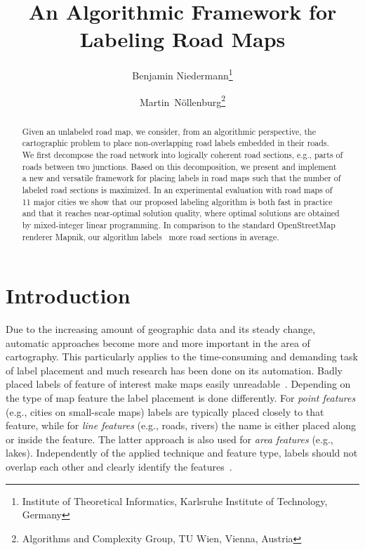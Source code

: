 \documentclass[a4paper,11pt]{article}
\title{An Algorithmic Framework for Labeling Road Maps}
\author{Benjamin Niedermann\thanks{Institute of Theoretical Informatics, Karlsruhe Institute of Technology, Germany} \and Martin~N\"ollenburg\thanks{Algorithms and Complexity Group, TU Wien, Vienna, Austria} }
\date{}
\begin{document}
\maketitle

\begin{abstract} 
  Given an unlabeled road map, we consider, from an algorithmic
  perspective, the cartographic problem to place non-overlapping road
  labels embedded in their roads.  We first decompose the road
  network into logically coherent road sections, e.g., parts of
  roads between two junctions.  Based on this decomposition, we present and implement a new and
  versatile framework for placing labels in road maps such that the
  number of labeled road sections is maximized. 
  In an experimental evaluation with road maps of 11 major cities we show that our proposed labeling algorithm is both fast in practice and that it reaches near-optimal solution quality, where optimal solutions are obtained by mixed-integer linear programming. In comparison to the standard OpenStreetMap renderer Mapnik, our algorithm labels~ more road sections in average.
\end{abstract}

\section{Introduction}
Due to the increasing amount of geographic data and its steady change,
automatic approaches become more and more important in the area of
cartography. This particularly applies to the time-consuming and demanding task of label
placement and much research has been done on its automation.
Badly placed labels of feature of interest make maps easily
unreadable~\cite{imhof}. Depending on the type of map feature the label
placement is done differently. For \emph{point features} (e.g., cities
on small-scale maps) labels are typically placed closely to that
feature, while for \emph{line features} (e.g., roads, rivers) the name
is either placed along or inside the feature. The latter approach is
also used for \emph{area features} (e.g., lakes). Independently of the applied technique and feature type, labels should not overlap each other and
clearly identify the features~\cite{criteria}. 
\end{document}
